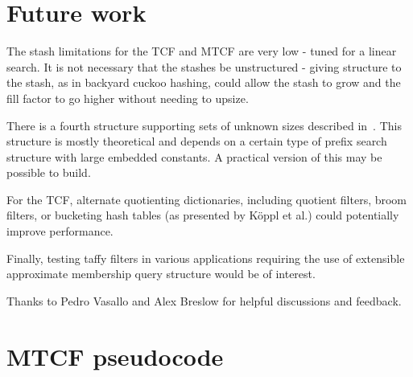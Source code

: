 \documentclass[sigconf, nonacm]{acmart}
\newcommand{\etal}{et al.}
\begin{document}



\section{Future work}
\label{conclusion}

The stash limitations for the TCF and MTCF are very low - tuned for a linear search.
It is not necessary that the stashes be unstructured - giving structure to the stash, as in backyard cuckoo hashing, could allow the stash to grow and the fill factor to go higher without needing to upsize.~\cite{backyard}

There is a fourth structure supporting sets of unknown sizes described in~\cite{unknown-prefix}.
This structure is mostly theoretical and depends on a certain type of prefix search structure with large embedded constants.
A practical version of this may be possible to build.

For the TCF, alternate quotienting dictionaries, including quotient filters, broom filters, or bucketing hash tables (as presented by K\"oppl \etal{}) could potentially improve performance.~\cite{raman-practical,broom,quotient-filter}

Finally, testing taffy filters in various applications requiring the use of extensible approximate membership query structure would be of interest.

\begin{acks}
Thanks to Pedro Vasallo and Alex Breslow for helpful discussions and feedback.
\end{acks}



\pagebreak
\appendix
\section{MTCF pseudocode}
\label{mtcf-appendix}
 

\end{document}
